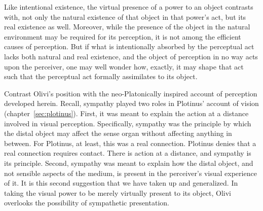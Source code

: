 Like intentional existence, the virtual presence of a power to an object contrasts with, not only the natural existence of that object in that power's act, but its real existence as well. Moreover, while the presence of the object in the natural environment may be required for its perception, it is not among the efficient causes of perception. But if what is intentionally absorbed by the perceptual act lacks both natural and real existence, and the object of perception in no way acts upon the perceiver, one may well wonder how, exactly, it may shape that act such that the perceptual act formally assimilates to its object.

Contrast Olivi's position with the neo-Platonically inspired account of perception developed herein. Recall, sympathy played two roles in Plotinus' account of vision (chapter~\ref{sec:plotinus}). First, it was meant to explain the action at a distance involved in visual perception. Specifically, sympathy was the principle by which the distal object may affect the sense organ without affecting anything in between. For Plotinus, at least, this was a real connection. Plotinus denies that a real connection requires contact. There is action at a distance, and sympathy is its principle. Second, sympathy was meant to explain how the distal object, and not sensible aspects of the medium, is present in the perceiver's visual experience of it. It is this second suggestion that we have taken up and generalized. In taking the visual power to be merely virtually present to its object, Olivi overlooks the possibility of sympathetic presentation. 

